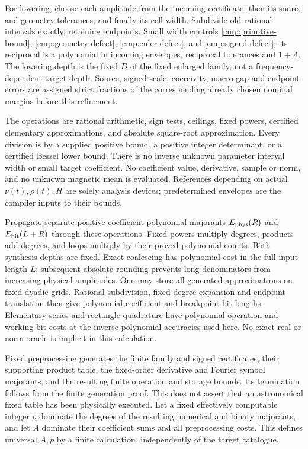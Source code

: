 \documentclass[11pt,a4paper]{amsart}
\theoremstyle{definition}
\theoremstyle{remark}
\numberwithin{equation}{section}
\begin{document}
For lowering, choose each amplitude from the incoming certificate, then
its source and geometry tolerances, and finally its cell width. Subdivide
old rational intervals exactly, retaining endpoints. Small width controls
\eqref{cmp:primitive-bound}, \eqref{cmp:geometry-defect},
\eqref{cmp:euler-defect}, and \eqref{cmp:signed-defect}; its reciprocal is
a polynomial in incoming envelopes, reciprocal tolerances and $1+\Lambda$.
The lowering depth is the fixed $D$ of the fixed enlarged family, not a
frequency-dependent target depth. Source, signed-scale, coercivity,
macro-gap and endpoint errors are assigned strict fractions of the
corresponding already chosen nominal margins before this refinement.

The operations are rational arithmetic, sign tests, ceilings, fixed powers,
certified elementary approximations, and absolute square-root approximation.
Every division is by a supplied positive bound, a positive integer
determinant, or a certified Bessel lower bound. There is no inverse unknown
parameter interval width or small target coefficient. No coefficient value,
derivative, sample or norm, and no unknown magnetic mean is evaluated.
References depending on actual $\nu(t),\rho(t),H$ are solely analysis
devices; predetermined envelopes are the compiler inputs to their bounds.

Propagate separate positive-coefficient polynomial majorants
$E_{\rm phys}(R)$ and $E_{\rm bit}(L+R)$ through these operations.
Fixed powers multiply degrees, products add degrees, and loops multiply by
their proved polynomial counts. Both synthesis depths are fixed.
Exact coalescing has polynomial cost in the full input length $L$;
subsequent absolute rounding prevents long denominators from increasing
physical amplitudes. One may store all generated approximations on fixed
dyadic grids. Rational subdivision, fixed-degree expansion and endpoint
translation then give polynomial coefficient and breakpoint bit lengths.
Elementary series and rectangle quadrature have polynomial operation and
working-bit costs at the inverse-polynomial accuracies used here. No
exact-real or norm oracle is implicit in this calculation.

Fixed preprocessing generates the finite family and signed certificates,
their supporting product table, the fixed-order derivative and Fourier
symbol majorants, and the resulting finite operation and storage bounds.
Its termination follows from the finite generation proof. This does not
assert that an astronomical fixed table has been physically executed.
Let a fixed effectively computable integer $p$ dominate the degrees of
the resulting numerical and binary majorants, and let $A$ dominate their
coefficient sums and all preprocessing costs. This defines universal $A,p$
by a finite calculation, independently of the target catalogue.
\end{document}
